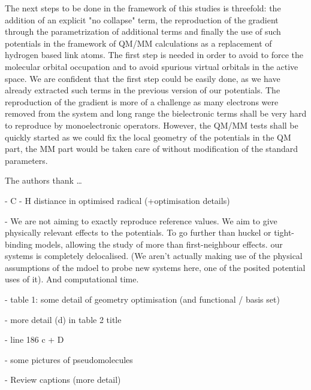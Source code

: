 \documentclass[journal=jctcce,manuscript=article]{achemso}
\begin{document}
The next steps to be done in the framework of this studies is threefold: the addition of an explicit
"no collapse" term, the reproduction of the gradient through the parametrization
of additional terms and finally the use of such potentials in the framework
of QM/MM calculations as a replacement of hydrogen based link atoms.
The first step is needed in order to avoid to force the molecular orbital occupation and
to avoid spurious virtual orbitals in the active space.
We are confident that the first step could be easily done, as we have already extracted such
terms in the previous version of our potentials.
The reproduction of the gradient is more of a challenge as many electrons were removed from the
system and long range the bielectronic terms shall be very hard to reproduce by monoelectronic
operators.
However, the QM/MM tests shall be quickly started as we could fix the local geometry of the potentials
in the QM part, the MM part would be taken care of without modification of the standard parameters.
\begin{acknowledgement}

The authors thank \ldots

\end{acknowledgement}

- C - H distiance in optimised radical (+optimisation details)

- We are not aiming to exactly reproduce reference values. We aim to give physically relevant effects to the potentials. To go further than huckel or tight-binding models, allowing the study of more than first-neighbour effects. our systems is completely delocalised. (We aren't actually making use of the physical assumptions of the mdoel to probe new systems here, one of the posited potential uses of it). And computational time.

- table 1: some detail of geometry optimisation (and functional / basis set)

- more detail (d) in table 2 title

- line 186 c + D

- some pictures of pseudomolecules

- Review captions (more detail)
\end{document}
